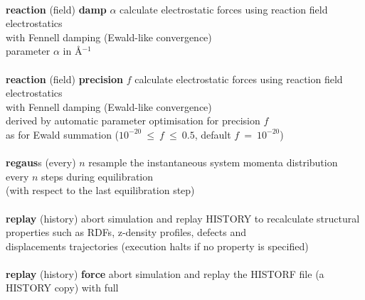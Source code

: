 \begin{tabbing}
\>                                              \> \\
\> {\bf reaction} (field) {\bf damp} $\alpha$   \> calculate electrostatic forces using reaction field electrostatics \\
\>                                              \> with Fennell \cite{fennell-06a} damping (Ewald-like convergence) \\
\>                                              \> parameter $\alpha$ in \AA$^{-1}$ \\
\>                                              \> \\
\> {\bf reaction} (field) {\bf precision} $f$   \> calculate electrostatic forces using reaction field electrostatics \\
\>                                              \> with Fennell \cite{fennell-06a} damping (Ewald-like convergence) \\
\>                                              \> derived by automatic parameter optimisation for precision $f$ \\
\>                                              \> as for Ewald summation ($10^{-20}~\le~f~\le~0.5$, default $f~=~10^{-20}$) \\
\>                                              \> \\
\> {\bf regaus}s (every) $n$                    \> resample the instantaneous system momenta distribution \\
\>                                              \> every $n$ steps during equilibration \\
\>                                              \> (with respect to the last equilibration step) \\
\>                                              \> \\
\> {\bf replay} (history)                       \> abort simulation and replay HISTORY to recalculate structural \\
\>                                              \> properties such as RDFs, z-density profiles, defects and \\
\>                                              \> displacements trajectories (execution halts if no property is specified) \\
\>                                              \> \\
\> {\bf replay} (history) {\bf force}           \> abort simulation and replay the HISTORF file (a HISTORY copy) with full \\

\end{tabbing}
